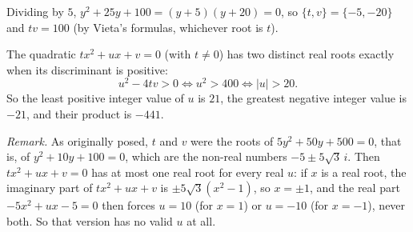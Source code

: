 Dividing by $5$, $y^2+25y+100=(y+5)(y+20)=0$, so $\{t,v\}=\{-5,-20\}$ and $tv=100$ (by Vieta's formulas, whichever root is $t$).

The quadratic $tx^2+ux+v=0$ (with $t\ne0$) has two distinct real roots exactly when its discriminant is positive:
\[u^2-4tv>0\iff u^2>400\iff|u|>20 .\]
So the least positive integer value of $u$ is $21$, the greatest negative integer value is $-21$, and their product is $\boxed{-441}$.

\emph{Remark.} As originally posed, $t$ and $v$ were the roots of $5y^2+50y+500=0$, that is, of $y^2+10y+100=0$, which are the non-real numbers $-5\pm5\sqrt3\,i$. Then $tx^2+ux+v=0$ has at most one real root for every real $u$: if $x$ is a real root, the imaginary part of $tx^2+ux+v$ is $\pm5\sqrt3\left(x^2-1\right)$, so $x=\pm1$, and the real part $-5x^2+ux-5=0$ then forces $u=10$ (for $x=1$) or $u=-10$ (for $x=-1$), never both. So that version has no valid $u$ at all.
